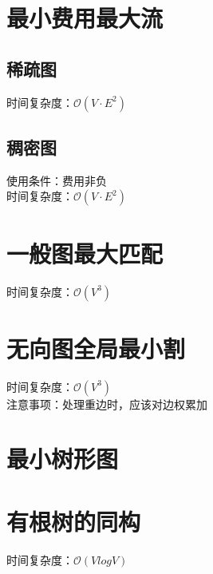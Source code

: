 \documentclass[landscape, oneside, a4paper, cs4size]{book}
\begin{document}
\begin{multicols}{2}
			\section{最小费用最大流}
			\begin{spacing}{0.8}
				\subsection{稀疏图}
					时间复杂度：$\mathcal{O}(V \cdot E^2)$
					
				\subsection{稠密图}
					使用条件：费用非负\\
					\indent 时间复杂度：$\mathcal{O}(V \cdot E^2)$
					
			\end{spacing}
			\section{一般图最大匹配}
			\begin{spacing}{0.8}
				时间复杂度：$\mathcal{O}(V^3)$
				
			\end{spacing}
			\section{无向图全局最小割}
			\begin{spacing}{0.8}
				时间复杂度：$\mathcal{O}(V^3)$\\
				\indent 注意事项：处理重边时，应该对边权累加
				
			\end{spacing}
			\section{最小树形图}
			\begin{spacing}{0.8}
				
			\end{spacing}
			\section{有根树的同构}
			\begin{spacing}{0.8}
				时间复杂度：$\mathcal{O}(V log V)$
				
			\end{spacing}

\end{multicols}
\end{document}
